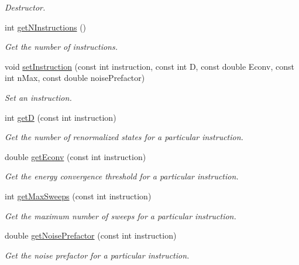 \begin{DoxyCompactItemize}
\begin{DoxyCompactList}\small\item\em Destructor. \end{DoxyCompactList}\item 
int \hyperlink{classCheMPS2_1_1ConvergenceScheme_ab8c98d5388c415c42115084c5817e1dc}{get\-N\-Instructions} ()
\begin{DoxyCompactList}\small\item\em Get the number of instructions. \end{DoxyCompactList}\item 
void \hyperlink{classCheMPS2_1_1ConvergenceScheme_a454421f377a2be63872d9199b84bad95}{set\-Instruction} (const int instruction, const int D, const double Econv, const int n\-Max, const double noise\-Prefactor)
\begin{DoxyCompactList}\small\item\em Set an instruction. \end{DoxyCompactList}\item 
int \hyperlink{classCheMPS2_1_1ConvergenceScheme_abb766295f71d3c1e3b9edc875504b317}{get\-D} (const int instruction)
\begin{DoxyCompactList}\small\item\em Get the number of renormalized states for a particular instruction. \end{DoxyCompactList}\item 
double \hyperlink{classCheMPS2_1_1ConvergenceScheme_a531e6d2a63b7fb8ad6d09bffd740687f}{get\-Econv} (const int instruction)
\begin{DoxyCompactList}\small\item\em Get the energy convergence threshold for a particular instruction. \end{DoxyCompactList}\item 
int \hyperlink{classCheMPS2_1_1ConvergenceScheme_abab59f923fab04a8def8ec6af9748df5}{get\-Max\-Sweeps} (const int instruction)
\begin{DoxyCompactList}\small\item\em Get the maximum number of sweeps for a particular instruction. \end{DoxyCompactList}\item 
double \hyperlink{classCheMPS2_1_1ConvergenceScheme_a06c60aeec22896b5018541ebcae2aeb8}{get\-Noise\-Prefactor} (const int instruction)
\begin{DoxyCompactList}\small\item\em Get the noise prefactor for a particular instruction. \end{DoxyCompactList}\end{DoxyCompactItemize}


